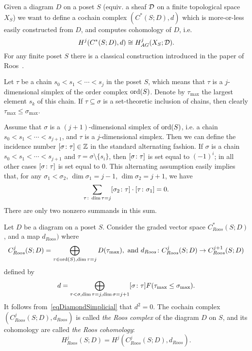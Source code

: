 
Given a diagram $D$ on a poset $S$ (equiv. a sheaf $\mathcal{D}$ on a finite topological space $X_S$) we want to define a cochain complex $(C^*(S;D),d)$ which is more-or-less easily constructed from $D$, and computes cohomology of $D$, i.e.
\[
H^j(C^*(S;D),d)\cong H^j_{AG}(X_S;\mathcal{D}).
\]
For any finite poset $S$ there is a classical construction introduced in the paper of Roos~\cite{roos1961derlim}.

\begin{con}\label{conLargestEltOfChain}
Let $\tau$ be a chain $s_0<s_1<\cdots<s_j$ in the poset $S$, which means that $\tau$ is a $j$-dimensional simplex of the order complex $\operatorname{ord}(S)$. Denote by $\tau_{\max}$ the largest element $s_k$ of this chain. If $\tau\subseteq\sigma$ is a set-theoretic inclusion of chains, then clearly $\tau_{\max}\leq \sigma_{\max}$.
\end{con}

\begin{con}\label{conStandardSimplicialIncNumbers}
Assume that $\sigma$ is a $(j+1)$-dimensional simplex of $\operatorname{ord}(S)$, i.e. a chain $s_0<s_1<\cdots<s_{j+1}$, and $\tau$ is a $j$-dimensional simplex. Then we can define the incidence number $[\sigma\colon \tau]\in\mathbb{Z}$ in the standard alternating fashion. If $\sigma$ is a chain $s_0<s_1<\cdots<s_{j+1}$ and $\tau=\sigma\setminus\{s_i\}$, then $[\sigma\colon \tau]$ is set equal to $(-1)^i$; in all other cases $[\sigma\colon \tau]$ is set equal to $0$. This alternating assumption easily implies that, for any $\sigma_1<\sigma_2$, $\dim\sigma_1=j-1$, $\dim\sigma_2=j+1$, we have
\begin{equation}\label{eqDiamondSimplicial}
\sum_{\tau\colon \dim\tau=j}[\sigma_2\colon \tau]\cdot[\tau\colon \sigma_1]=0.
\end{equation}
There are only two nonzero summands in this sum.
\end{con}

\begin{defin}\label{definRoosComplex}
Let $D$ be a diagram on a poset $S$. Consider the graded vector space $C^*_{Roos}(S;D)$, and a map $d_{Roos})$ where
\[
C^j_{Roos}(S;D)=\bigoplus_{\tau\in\operatorname{ord}(S),\dim\tau=j}D(\tau_{\max}),\mbox{ and }d_{Roos}\colon C^j_{Roos}(S;D)\to C^{j+1}_{Roos}(S;D)
\]
defined by
\[
d=\bigoplus_{\tau<\sigma, \dim\tau=j,\dim\sigma=j+1}[\sigma\colon \tau]F(\tau_{\max}\leq \sigma_{\max}).
\]
It follows from~\eqref{eqDiamondSimplicial} that $d^2=0$. The cochain complex $(C^j_{Roos}(S;D),d_{Roos})$ is called \emph{the Roos complex} of the diagram $D$ on $S$, and its cohomology are called \emph{the Roos cohomology}:
\[
H^j_{Roos}(S;D)=H^j(C^j_{Roos}(S;D),d_{Roos}).
\]
\end{defin}

